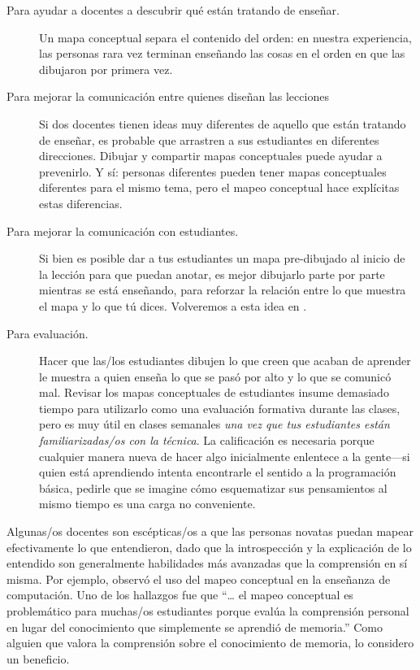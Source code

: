 \begin{description}

\item[Para ayudar a docentes a descubrir qué están tratando de enseñar.]
  Un mapa conceptual separa el contenido del orden:
  en nuestra experiencia,
  las personas rara vez terminan enseñando las cosas en el orden en que las dibujaron por primera vez.

\item[Para mejorar la comunicación entre quienes diseñan las lecciones]
  Si dos docentes tienen ideas muy diferentes de aquello que están tratando de enseñar, es probable que arrastren a sus estudiantes en diferentes direcciones.
  Dibujar y compartir mapas conceptuales puede ayudar a prevenirlo.
  Y sí:
  personas diferentes pueden tener mapas conceptuales diferentes para el mismo tema,
  pero el mapeo conceptual hace explícitas estas diferencias.

\item[Para mejorar la comunicación con estudiantes.]
  Si bien es posible dar a tus estudiantes un mapa pre-dibujado al inicio de la lección para que puedan anotar,
  es mejor dibujarlo parte por parte mientras se está enseñando,
  para reforzar la relación entre lo que muestra el mapa y lo que tú dices.
  Volveremos a esta idea en .

\item[Para evaluación.]
  Hacer que las/los estudiantes dibujen lo que creen que acaban de aprender
  le muestra a quien enseña lo que se pasó por alto y lo que se comunicó mal.
  Revisar los mapas conceptuales de estudiantes insume demasiado tiempo para utilizarlo como una evaluación formativa durante las clases,
  pero es muy útil en clases semanales \emph{una vez que tus estudiantes están familiarizadas/os con la técnica}.
  La calificación es necesaria porque
  cualquier manera nueva de hacer algo inicialmente enlentece a la gente---si quien está aprendiendo intenta encontrarle el sentido a la programación básica,
  pedirle que se imagine cómo esquematizar sus pensamientos al mismo tiempo es una carga no conveniente.

\end{description}

Algunas/os docentes son escépticas/os a que las personas novatas puedan mapear efectivamente lo que entendieron,
dado que la introspección y la explicación de lo entendido son generalmente habilidades más avanzadas que la comprensión en sí misma.
Por ejemplo,
\cite{Kepp2008} observó el uso del mapeo conceptual en la enseñanza de computación.
Uno de los hallazgos fue que
``{\ldots} el mapeo conceptual es problemático para muchas/os estudiantes porque
evalúa la comprensión personal en lugar del conocimiento que simplemente se aprendió de memoria.''
Como alguien que valora la comprensión sobre el conocimiento de memoria, 
lo considero un beneficio.

